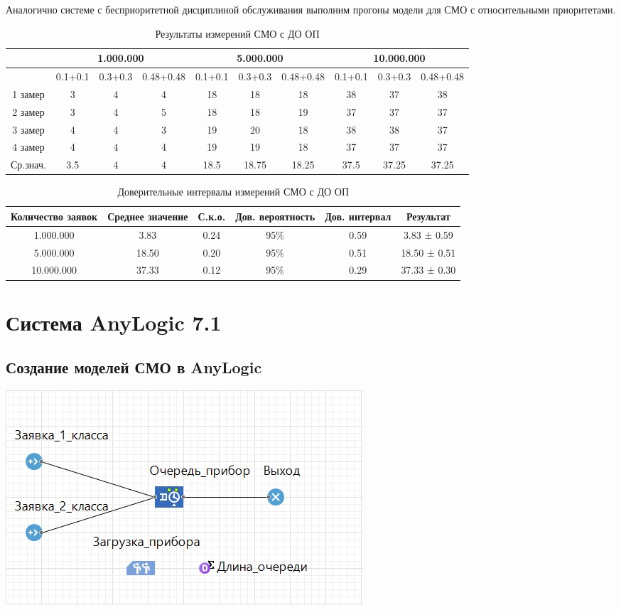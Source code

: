 \documentclass[a4paper,14pt]{report} %
\begin{document}
Аналогично системе с бесприоритетной дисциплиной обслуживания выполним прогоны модели для СМО с относительными приоритетами.

\begin{table}[h!]
\caption{Результаты измерений СМО с ДО ОП}
\begin{tabular}{|c|c|c|c|c|c|c|c|c|c|}
\hline
 & \multicolumn{3}{|c|}{1.000.000} & \multicolumn{3}{|c|}{5.000.000} & \multicolumn{3}{|c|}{10.000.000} \\
\hline
 & 0.1+0.1 & 0.3+0.3 & 0.48+0.48 & 0.1+0.1 & 0.3+0.3 & 0.48+0.48 & 0.1+0.1 & 0.3+0.3 & 0.48+0.48 \\
\hline
1 замер & 3 & 4 & 4 & 18 & 18 & 18 & 38 & 37 & 38  \\
\hline
2 замер & 3 & 4 & 5 & 18 & 18 & 19 & 37 & 37 & 37 \\
\hline
3 замер &  4 & 4 & 3 & 19 & 20 & 18 & 38 & 38 & 37 \\
\hline
4 замер & 4 & 4 & 4 & 19 & 19 & 18 & 37 & 37 & 37 \\
\hline
Ср.знач. &  3.5 & 4 & 4 & 18.5 & 18.75 & 18.25 & 37.5 & 37.25 & 37.25 \\
\hline
\end{tabular}
\end{table} 

\begin{table}[h!]
\caption{Доверительные интервалы измерений СМО с ДО ОП}
\begin{tabular}{|c|c|c|c|c|c|}
\hline
 Количество заявок & Среднее значение & С.к.о. & Дов. вероятность & Дов. интервал & Результат\\
\hline
1.000.000 & 3.83 & 0.24 & 95\% & 0.59 & 3.83 ± 0.59 \\
\hline
5.000.000 & 18.50 & 0.20 & 95\% & 0.51 & 18.50 ± 0.51 \\
\hline
10.000.000 & 37.33 & 0.12 & 95\% &0.29 & 37.33 ± 0.30 \\
\hline
\end{tabular}
\end{table} 

\section{Система AnyLogic 7.1}
\subsection{Создание моделей СМО в AnyLogic}
\includegraphics[width=0.5\linewidth]{model_AnyLogic}
\end{document}
